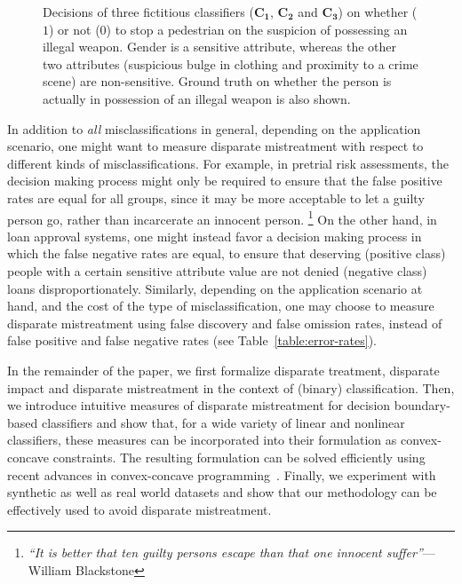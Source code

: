 \documentclass[letterpaper]{sig-alternate-2013}
\newcommand{\disc}{disparate mistreatment}
\begin{document}
\begin{figure}[ht]
{\begin{tabular}{|c|c|c|c|c|c|c|c|c|c|c|c|c|c|}
\end{tabular}
}

\caption{
\small{
Decisions of three fictitious classifiers ($\mathbf{C_1}$, $\mathbf{C_2}$ and $\mathbf{C_3}$) on whether ($1$) or not ($0$) to stop a pedestrian on the suspicion of possessing an illegal weapon. Gender is a sensitive attribute, whereas the other two attributes (suspicious bulge in clothing and proximity to a crime scene) are non-sensitive. Ground truth on whether the person is actually in possession of an illegal weapon is also shown.
}
}
\vspace{-3ex}
\label{table:examples-disc}
\end{figure}

In addition to \textit{all} misclassifications in general, depending
on the application scenario, one might want to measure \disc{} with
respect to different kinds of misclassifications.
For example, in pretrial risk assessments,
the decision making process might only be required to ensure that
the false positive rates are equal for all groups, since it may be more acceptable to let
a guilty person go, rather than incarcerate an innocent
person.
\footnote{
\scriptsize{\textit{``It is better that ten guilty persons escape than that one innocent suffer''}---William Blackstone}
}
On the other hand, in loan approval systems, one might instead favor a
decision making process in which the false negative rates are equal,
to ensure that deserving (positive class) people with a certain
sensitive attribute value are not denied (negative class) loans
disproportionately.
Similarly, depending on the application scenario at hand, and the cost of the type of misclassification, one may choose to measure  \disc{} using
false discovery and false omission rates, instead of false positive and false negative rates (see Table~\ref{table:error-rates}).

In the remainder of the paper, we first formalize disparate treatment, disparate impact and disparate mistreatment in the context of (binary) classification.
Then, we introduce intuitive measures of \disc{} for
decision boundary-based classifiers and show that, for a wide variety
of linear and nonlinear classifiers, these measures can be incorporated
into their formulation as convex-concave constraints. The resulting
formulation can be solved efficiently using recent advances in
convex-concave programming~\cite{boyd_concave_convex}.
Finally, we experiment with synthetic as well as real world datasets and show that our
methodology can be effectively used to avoid \disc{}.
\end{document}
